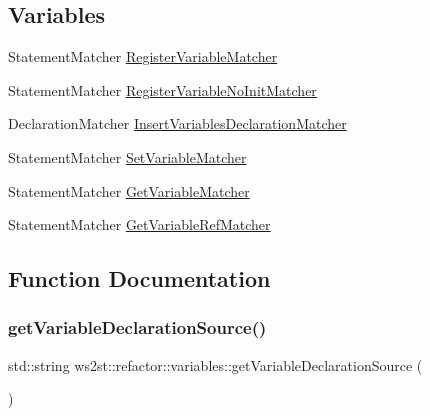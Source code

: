 \subsection*{Variables}
\begin{DoxyCompactItemize}
\item 
Statement\+Matcher \mbox{\hyperlink{namespacews2st_1_1refactor_1_1variables_afd44f50cdfee36cffc078a0a476443ac}{Register\+Variable\+Matcher}}
\item 
Statement\+Matcher \mbox{\hyperlink{namespacews2st_1_1refactor_1_1variables_aa604808c747d1f1c063e9486b2938ed7}{Register\+Variable\+No\+Init\+Matcher}}
\item 
Declaration\+Matcher \mbox{\hyperlink{namespacews2st_1_1refactor_1_1variables_aa3430fb2507e08ed6f9f620b0b72894f}{Insert\+Variables\+Declaration\+Matcher}}
\item 
Statement\+Matcher \mbox{\hyperlink{namespacews2st_1_1refactor_1_1variables_a954310f0d468e2af710cdee89425736a}{Set\+Variable\+Matcher}}
\item 
Statement\+Matcher \mbox{\hyperlink{namespacews2st_1_1refactor_1_1variables_acb7644acb8e3aa823648a4178f2d893e}{Get\+Variable\+Matcher}}
\item 
Statement\+Matcher \mbox{\hyperlink{namespacews2st_1_1refactor_1_1variables_ac49f830b8c6647d5b2c4a6957a304ab0}{Get\+Variable\+Ref\+Matcher}}
\end{DoxyCompactItemize}


\subsection{Function Documentation}
\mbox{\label{namespacews2st_1_1refactor_1_1variables_aa668312b7309e9263a184d843ff80dec}} 
\subsubsection{\texorpdfstring{get\+Variable\+Declaration\+Source()}{getVariableDeclarationSource()}}
{\footnotesize\ttfamily std\+::string ws2st\+::refactor\+::variables\+::get\+Variable\+Declaration\+Source (\begin{DoxyParamCaption}{ }\end{DoxyParamCaption})}

